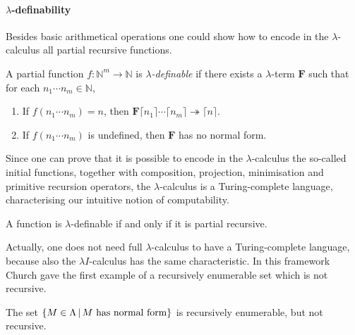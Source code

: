 \paragraph{$\lambda$-definability}
Besides basic arithmetical operations one could show how to encode in the $\lambda$-calculus all partial recursive functions. 
\begin{definition}
	A partial function $f:\mathbb{N}^m\rightarrow\mathbb{N}$ is \emph{$\lambda$-definable} if there exists a $\lambda$-term $\mathbf{F}$ such that for each $n_1\cdots n_m\in\mathbb{N}$,
	\begin{enumerate}
		\item If $f(n_1\cdots n_m)=n$, then $\mathbf{F}\lceil n_1\rceil\cdots\lceil n_m\rceil\twoheadrightarrow \lceil n\rceil$.
		\item If $f(n_1\cdots n_m)$ is undefined, then $\mathbf{F}$  has no normal form.
	\end{enumerate}
\end{definition}
Since one can prove that it is possible to encode in the $\lambda$-calculus the so-called initial functions, together with composition, projection, minimisation and primitive recursion operators, the $\lambda$-calculus is a Turing-complete language, characterising our intuitive notion of computability.
\begin{theorem}
	A function is $\lambda$-definable if and only if it is partial recursive.
\end{theorem}
Actually, one does not need full $\lambda$-calculus to have a Turing-complete language, because also the $\lambda I$-calculus has the same characteristic. In this framework Church gave the first example of a recursively enumerable set which is not recursive.
\begin{theorem}
	The set $\{M\in\Lambda\,|\,M\textrm{ has normal form}\}$ is recursively enumerable, but not recursive.
\end{theorem}
